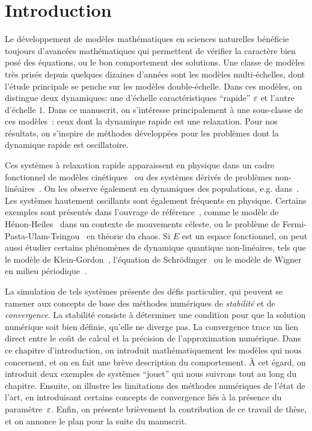 \chapter*{Introduction}


Le développement de modèles mathématiques en sciences naturelles bénéficie toujours d'avancées mathématiques qui permettent de vérifier la caractère bien posé des équations, ou le bon comportement des solutions. Une classe de modèles très prisés depuis quelques dizaines d'années sont les modèles multi-échelles, dont l'étude principale se penche sur les modèles double-échelle. Dans ces modèles, on distingue deux dynamiques: une d'échelle caractéristiques \enquote{rapide} $\varepsilon$ et l'autre d'échelle $1$. Dans ce manuscrit, on s'intéresse principalement à une sous-classe de ces modèles~: ceux dont la dynamique rapide est une relaxation. Pour nos résultats, on s'inspire de méthodes développées pour les problèmes dont la dynamique rapide est oscillatoire. 


Ces systèmes à relaxation rapide apparaissent en physique dans un cadre fonctionnel de modèles cinétiques~\cite{bhatnagar.1954.model,lemou.2008.new} ou des systèmes dérivés de problèmes non-linéaires~\cite{jin.1995.relaxation}. On les observe également en dynamiques des populations, e.g. dans~\cite{greiner.1994.singular,auger.1996.emergence,sanchez.2000.singular,castella.2018.analysis}. Les systèmes hautement oscillants sont également fréquents en physique. Certains exemples sont présentés dans l'ouvrage de référence~\cite[Chap.~I]{hairer.2006.geometric}, comme le modèle de Hénon-Heiles~\cite{henon.1964.applicability} dans un contexte de mouvements céleste, ou le problème de Fermi-Pasta-Ulam-Tsingou~\cite{ford.1992.fermi} en théorie du chaos. Si $E$ est un espace fonctionnel, on peut aussi étudier certains phénomènes de dynamique quantique non-linéaires, tels que le modèle de Klein-Gordon~\cite{bao.2012.analysis}, l'équation de Schrödinger~\cite{grebert.2011.energy} ou le modèle de Wigner en milieu périodique~\cite{crouseilles.2017.nonlinear,morandi.2011.wigner}.


La simulation de tels systèmes présente des défis particulier, qui peuvent se ramener aux concepts de base des méthodes numériques de \textit{stabilité} et de \textit{convergence}. La stabilité consiste à déterminer une condition pour que la solution numérique soit bien définie, qu'elle ne diverge pas. La convergence trace un lien direct entre le coût de calcul et la précision de l'approximation numérique. Dans ce chapitre d'introduction, on introduit mathématiquement les modèles qui nous concernent, et on en fait une brève description du comportement. À cet égard, on introduit deux exemples de systèmes \enquote{jouet} qui nous suivrons tout au long du chapitre. Ensuite, on illustre les limitations des méthodes numériques de l'état de l'art, en introduisant certains concepts de convergence liés à la présence du paramètre~$\varepsilon$. Enfin, on présente brièvement la contribution de ce travail de thèse, et on annonce le plan pour la suite du manuscrit. 


